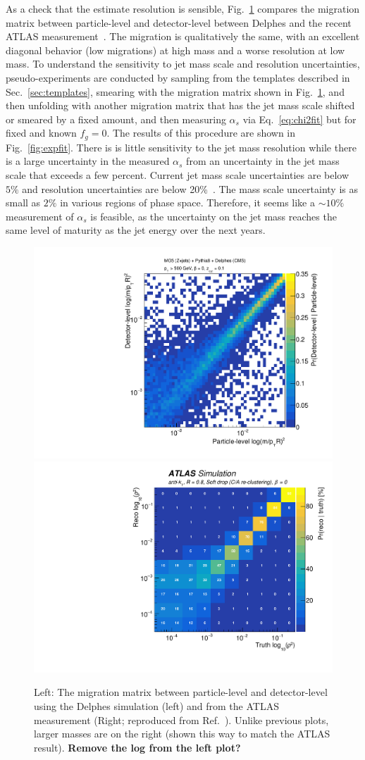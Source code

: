 As a check that the estimate resolution is sensible, Fig.~\ref{fig:expres} compares the migration matrix between particle-level and detector-level between Delphes and the recent ATLAS measurement~\cite{Aaboud:2017qwh}.  The migration is qualitatively the same, with an excellent diagonal behavior (low migrations) at high mass and a worse resolution at low mass.  To understand the sensitivity to jet mass scale and resolution uncertainties, pseudo-experiments are conducted by sampling from the templates described in Sec.~\ref{sec:templates}, smearing with the migration matrix shown in Fig.~\ref{fig:expres}, and then unfolding with another migration matrix that has the jet mass scale shifted or smeared by a fixed amount, and then measuring $\alpha_s$ via Eq.~\ref{eq:chi2fit} but for fixed and known $f_g=0$.  The results of this procedure are shown in Fig.~\ref{fig:expfit}.  There is is little sensitivity to the jet mass resolution while there is a large uncertainty in the measured $\alpha_s$ from an uncertainty in the jet mass scale that exceeds a few percent.  Current jet mass scale uncertainties are below $5\%$ and resolution uncertainties are below 20\%~\cite{}.  The mass scale uncertainty is as small as $2\%$ in various regions of phase space.  Therefore, it seems like a $\sim 10\%$ measurement of $\alpha_s$ is feasible, as the uncertainty on the jet mass reaches the same level of maturity as the jet energy over the next years.

\begin{figure}[h!]
\begin{center}
\includegraphics[width = 0.49\columnwidth]{figures/SD_resolution.pdf}\includegraphics[width = 0.49\columnwidth]{figures/figaux_03a.pdf}
\end{center}
\caption{Left: The migration matrix between particle-level and detector-level using the Delphes simulation (left) and from the ATLAS measurement (Right; reproduced from Ref.~\cite{Aaboud:2017qwh}).  Unlike previous plots, larger masses are on the right (shown this way to match the ATLAS result). \textbf{Remove the log from the left plot?}}
\label{fig:expres}
\end{figure}

